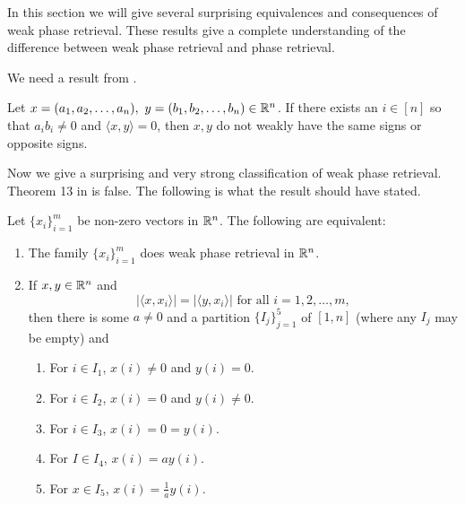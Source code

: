 In this section we will give several surprising equivalences and consequences of weak phase retrieval. These results give a complete understanding
of the difference between weak phase retrieval and phase retrieval.

We need a result from \cite{CAR2021}.

\begin{theorem}\label{T70}
Let $x=(a_1,a_2,\ldots,a_n),\ y=(b_1,b_2,\ldots,b_n)\in \mathbb R^n$. If there exists an $i\in [n]$ so that $a_ib_i\not= 0$ and
$\langle x,y\rangle =0$, then $x,y$ do not weakly have the same signs or opposite signs. 
\end{theorem}



Now we give a surprising and very strong classification of weak phase retrieval. Theorem 13 in \cite{CAR2021}
is false. The following is what the result should have stated.

\begin{theorem}\label{T33}
Let $\{x_i\}_{i=1}^{m}$ be non-zero vectors in $\mathbb R^n$. The following are equivalent:
\begin{enumerate}
\item The family $\{x_i\}_{i=1}^{m}$ does weak phase retrieval in $\mathbb R^n$. 
\item If $x,y\in \mathbb R^n$ and
\begin{equation}\label{E8} |\langle x,x_i\rangle|=|\langle y,x_i\rangle|\mbox{ for all } i=1,2,\ldots,m,
\end{equation}
then there is some $a\not= 0$ and a partition $\{I_j\}_{j=1}^5$ of $[1,n]$ (where any $I_j$ may
be empty) and 
\begin{enumerate}
\item For $i\in I_1$, $x(i)\not= 0$ and $y(i)=0$.
\item For $i\in I_2$, $x(i)=0$ and $y(i)\not= 0$.
\item For $i\in I_3$, $x(i)=0=y(i)$.
\item For $I\in I_4$, $x(i)=ay(i)$.
\item For $x\in I_5$, $x(i)=\frac{1}{a}y(i)$.
\end{enumerate}
\end{enumerate}
\end{theorem}

